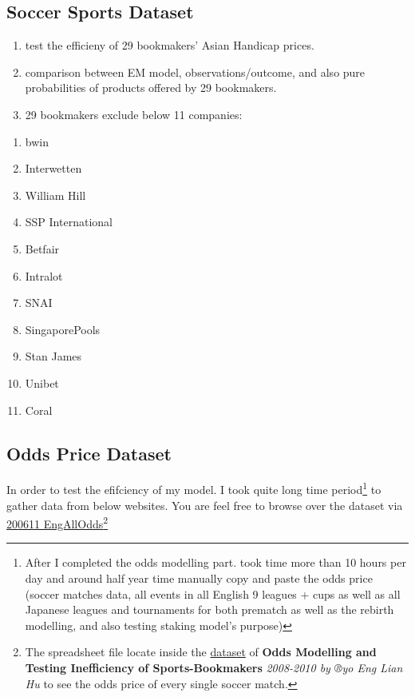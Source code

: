 \documentclass[article]{jss}
\providecommand{\tightlist}{%
  \setlength{\itemsep}{0pt}\setlength{\parskip}{0pt}}
\begin{document}
\subsection{Soccer Sports Dataset}\label{soccer-sports-dataset}

\begin{enumerate}
\def\labelenumi{\arabic{enumi})}
\tightlist
\item
  test the efficieny of 29 bookmakers' Asian Handicap prices.
\item
  comparison between EM model, observations/outcome, and also pure
  probabilities of products offered by 29 bookmakers.
\item
  29 bookmakers exclude below 11 companies:
\end{enumerate}

\begin{enumerate}
\def\labelenumi{\roman{enumi})}
\tightlist
\item
  bwin
\item
  Interwetten
\item
  William Hill
\item
  SSP International
\item
  Betfair
\item
  Intralot
\item
  SNAI
\item
  SingaporePools
\item
  Stan James
\item
  Unibet
\item
  Coral
\end{enumerate}

\subsection{Odds Price Dataset}\label{odds-price-dataset}

In order to test the efifciency of my model. I took quite long time
period\footnote{After I completed the odds modelling part. took time
  more than 10 hours per day and around half year time manually copy and
  paste the odds price (soccer matches data, all events in all English 9
  leagues + cups as well as all Japanese leagues and tournaments for
  both prematch as well as the rebirth modelling, and also testing
  staking model's purpose)} to gather data from below websites. You are
feel free to browse over the dataset via
\href{200611\%20EngAllOdds}{200611 EngAllOdds}\footnote{The spreadsheet
  file locate inside the
  \href{https://www.dropbox.com/home/Research\%20Project\%202}{dataset}
  of \textbf{Odds Modelling and Testing Inefficiency of
  Sports-Bookmakers} \emph{2008-2010 by ®yo Eng Lian Hu} to see the odds
  price of every single soccer match.} \bigbreak
\end{document}
